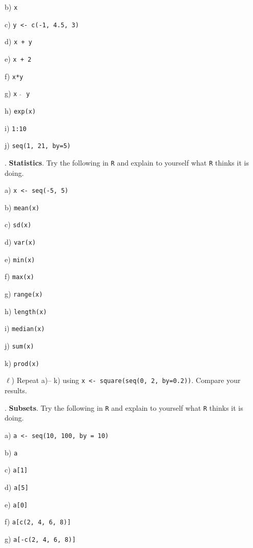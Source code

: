 \documentclass[10pt]{article}
\newcounter{EX}\setcounter{EX}{1}
\newcommand{\EXERCISE}{\arabic{EX}.\stepcounter{EX} }
\begin{document}
\SUBX b) \texttt{x}
\BSK

\SUBX c) \texttt{y <- c(-1, 4.5, 3)}
\BSK

\SUBX d) \texttt{x + y}
\BSK

\SUBX e) \texttt{x + 2}
\BSK

\SUBX f) \texttt{x*y}
\BSK

\SUBX g) \texttt{x  $\widehat{\hspace{3pt}}$  y}
\BSK

\SUBX h) \texttt{exp(x)}
\BSK

\SUBX i) \texttt{1:10}
\BSK

\SUBX j) \texttt{seq(1, 21, by=5)}
\BSK

\vfill
\eject

\EXERCISE \textbf{Statistics}.
Try the following in \texttt{R} and explain to yourself
what \texttt{R} thinks it is doing.

\SUBX a) \texttt{x <- seq(-5, 5)} %
\BSK

\SUBX b) \texttt{mean(x)}
\BSK

\SUBX c) \texttt{sd(x)}
\BSK

\SUBX d) \texttt{var(x)}
\BSK

\SUBX e) \texttt{min(x)}
\BSK

\SUBX f) \texttt{max(x)}
\BSK

\SUBX g) \texttt{range(x)}
\BSK

\SUBX h) \texttt{length(x)}
\BSK

\SUBX i) \texttt{median(x)}
\BSK

\SUBX j) \texttt{sum(x)}
\BSK

\SUBX k) \texttt{prod(x)}
\BSK

\SUBX $\ell$) Repeat a)-- k) using \texttt{x <- square(seq(0, 2, by=0.2))}.  
Compare your results.
\vspace{.6in}

\EXERCISE \textbf{Subsets}.  Try the following in \texttt{R} and explain to yourself
what \texttt{R} thinks it is doing.

\SUBX a) \texttt{a <- seq(10, 100, by = 10)}
\BSK

\SUBX b) \texttt{a}
\BSK

\SUBX c) \texttt{a[1]}
\BSK

\SUBX d) \texttt{a[5]}
\BSK

\SUBX e) \texttt{a[0]}
\BSK

\SUBX f) \texttt{a[c(2, 4, 6, 8)]}
\BSK

\SUBX g) \texttt{a[-c(2, 4, 6, 8)]}
\BSK
\end{document}
